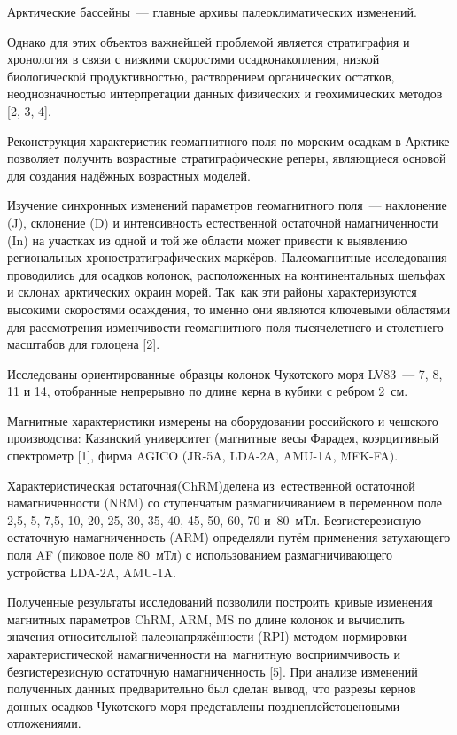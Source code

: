  

\makeProcTitle
{}

Арктические бассейны~--- главные архивы палеоклиматических
изменений.

Однако для этих объектов важнейшей проблемой является стратиграфия и
хронология в связи с низкими скоростями осадконакопления, низкой
биологической продуктивностью, растворением органических остатков,
неоднозначностью интерпретации данных физических и геохимических методов
[2, 3, 4].

Реконструкция характеристик геомагнитного поля по морским осадкам в
Арктике позволяет получить возрастные стратиграфические реперы,
являющиеся основой для создания надёжных возрастных моделей.

Изучение синхронных изменений параметров геомагнитного поля~--- наклонение (J), склонение (D) и интенсивность естественной остаточной намагниченности (In) на участках из одной и той же области может привести к выявлению региональных хроностратиграфических маркёров. Палеомагнитные исследования проводились для осадков колонок, расположенных на континентальных шельфах и склонах арктических окраин морей. Так~как эти районы характеризуются высокими скоростями осаждения, то именно они являются ключевыми областями для рассмотрения изменчивости геомагнитного поля тысячелетнего и столетнего масштабов для голоцена [2].

Исследованы ориентированные образцы колонок Чукотского моря LV83~--- 7, 8,
11 и 14, отобранные непрерывно по длине керна в кубики с ребром 2~см.

Магнитные характеристики измерены на оборудовании российского и чешского
производства: Казанский университет (магнитные весы Фарадея,
коэрцитивный спектрометр [1], фирма AGICO (JR-5A, LDA-2A, AMU-1A,
MFK-FA).

Характеристическая остаточная (ChRM)\-де\-ле\-на из~ес\-тест\-вен\-ной остаточной намагниченности (NRM) со ступенчатым размагничиванием в переменном поле 2,5, 5, 7,5, 10, 20, 25, 30, 35, 40, 45, 50, 60, 70 и~80~мТл. Безгистерезисную остаточную намагниченность (ARM) определяли путём применения затухающего поля AF (пиковое поле 80~мТл) с использованием размагничивающего устройства LDA-2A, AMU-1A.

Полученные результаты  исследований позволили построить кривые изменения магнитных параметров  ChRM, ARM, MS по длине колонок и вычислить значения относительной палеонапряжённости (RPI) методом нормировки характеристической намагниченности на~магнитную восприимчивость и безгистерезисную остаточную намагниченность [5]. При анализе изменений полученных данных предварительно был сделан вывод, что разрезы кернов донных осадков Чукотского моря представлены позднеплейстоценовыми отложениями.



